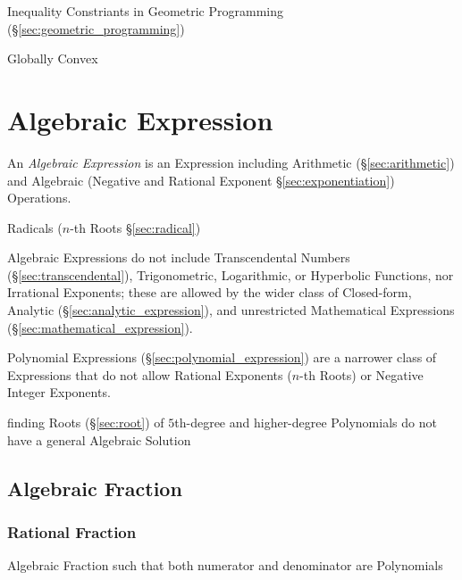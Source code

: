 Inequality Constriants in Geometric Programming
(\S\ref{sec:geometric_programming})

Globally Convex



\section{Algebraic Expression}\label{sec:algebraic_expression}

An \emph{Algebraic Expression} is an Expression including Arithmetic
(\S\ref{sec:arithmetic}) and Algebraic (Negative and Rational Exponent
\S\ref{sec:exponentiation}) Operations.

Radicals ($n$-th Roots \S\ref{sec:radical})

Algebraic Expressions do not include Transcendental Numbers
(\S\ref{sec:transcendental}), Trigonometric, Logarithmic, or Hyperbolic
Functions, nor Irrational Exponents; these are allowed by the wider class of
Closed-form, Analytic (\S\ref{sec:analytic_expression}), and unrestricted
Mathematical Expressions (\S\ref{sec:mathematical_expression}).

\fist Polynomial Expressions (\S\ref{sec:polynomial_expression}) are a narrower
class of Expressions that do not allow Rational Exponents ($n$-th Roots) or
Negative Integer Exponents.

finding Roots (\S\ref{sec:root}) of $5$th-degree and higher-degree
Polynomials do not have a general Algebraic Solution



\subsection{Algebraic Fraction}\label{sec:algebraic_fraction}

\subsubsection{Rational Fraction}\label{sec:rational_fraction}

Algebraic Fraction such that both numerator and denominator are Polynomials



